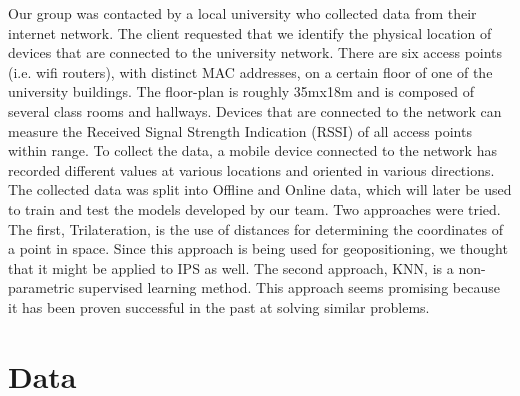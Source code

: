 \documentclass[12pt, conference]{IEEEtran}
\begin{document}
Our group was contacted by a local university who collected data from their internet network. The client requested that we identify the physical location of devices that are connected to the university network. There are six access points (i.e. wifi routers), with distinct MAC addresses, on a certain floor of one of the university buildings. The floor-plan is roughly 35mx18m and is composed of several class rooms and hallways. Devices that are connected to the network can measure the Received Signal Strength Indication (RSSI) of all access points within range. To collect the data, a mobile device connected to the network has recorded different values at various locations and oriented in various directions. The collected data was split into Offline and Online data, which will later be used to train and test the models developed by our team.
Two approaches were tried. The first, Trilateration, is the use of distances for determining the coordinates of a point in space. Since this approach is being used for geopositioning, we thought that it might be applied to IPS as well. The second approach, KNN, is a non-parametric supervised learning method. This approach seems promising because it has been proven successful in the past at solving similar problems.


\section{Data}
\end{document}
